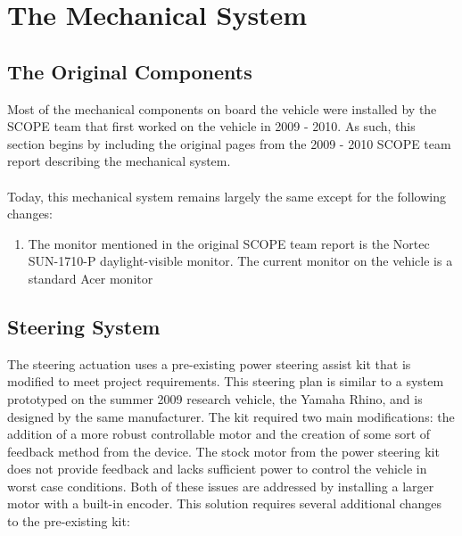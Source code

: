 \section{The Mechanical System}

\subsection{The Original Components}
Most of the mechanical components on board the vehicle were installed by the SCOPE team that first worked on the vehicle in 2009 - 2010. As such, this section begins by including the original pages from the 2009 - 2010 SCOPE team report describing the mechanical system. \\ \\
%
Today, this mechanical system remains largely the same except for the following changes:

\begin{enumerate}
\item The monitor mentioned in the original SCOPE team report is the Nortec SUN-1710-P daylight-visible monitor. The current monitor on the vehicle is a standard Acer monitor
\end{enumerate}

\newpage







\newpage

\subsection{Steering System}
The steering actuation uses a pre-existing power steering assist kit that is modified to meet project requirements. This steering plan is similar to a system prototyped on the summer 2009 research vehicle, the Yamaha Rhino, and is designed by the same manufacturer. The kit required two main modifications: the addition of a more robust controllable motor and the creation of some sort of feedback method from the device. The stock motor from the power steering kit does not provide feedback and lacks sufficient power to control the vehicle in worst case conditions. Both of these issues are addressed by installing a larger motor with a built-in encoder. This solution requires several additional changes to the pre-existing kit: 

